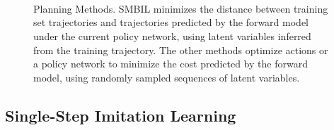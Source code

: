 \documentclass{article} %
\begin{document}
\begin{figure}[ht!]
    \centering
     \\
     \\
     \\
    \label{planning-methods}
    \caption{Planning Methods. SMBIL minimizes the distance between training set trajectories and trajectories predicted by the forward model under the current policy network, using latent variables inferred from the training trajectory. The other methods optimize actions or a policy network to minimize the cost predicted by the forward model, using randomly sampled sequences of latent variables.}
\end{figure}



  \subsection{Single-Step Imitation Learning}
\end{document}
